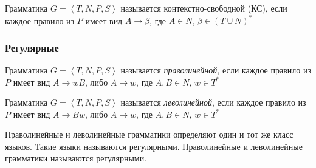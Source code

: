 Грамматика $G = \left\langle {T, N, P, S} \right\rangle$ называется контекстно-свободной (КС),
если каждое правило из $P$ имеет вид $A \rightarrow \beta$, где $A \in N$,
$\beta \in (T \cup N)^{*}$

\subsubsection{Регулярные}

Грамматика $G = \left\langle {T, N, P, S} \right\rangle$ называется \textit{праволинейной},
если каждое правило из $P$ имеет вид $A \rightarrow wB$, либо $A \rightarrow w$, 
где $A, B \in N$, $w \in T^{*}$ 

Грамматика $G = \left\langle {T, N, P, S} \right\rangle$ называется \textit{леволинейной},
если каждое правило из $P$ имеет вид $A \rightarrow Bw$, либо $A \rightarrow w$, 
где $A, B \in N$, $w \in T^{*}$ 

Праволинейные и леволинейные грамматики определяют один и тот же класс языков. 
Такие языки называются регулярными. 
Праволинейные и леволинейные грамматики называются регулярными.



